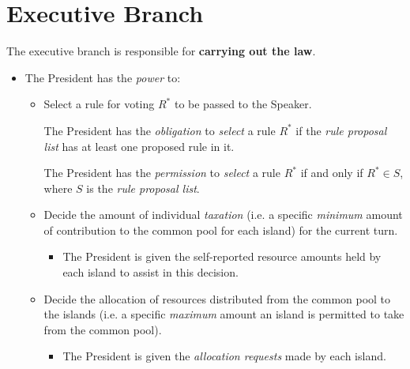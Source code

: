 \section{Executive Branch}
\label{sec:executive}
The executive branch is responsible for \textbf{carrying out the law}.
\begin{itemize}

    \item The President has the \emph{power} to:
    \begin{itemize}

        \item Select a rule for voting $R^{*}$ to be passed to the Speaker.
        \begin{rule_IIGO}
            The President has the \emph{obligation} to \emph{select} a rule $R^{*}$ if the \emph{rule proposal list} has at least one proposed rule in it.
        \end{rule_IIGO}
        \begin{rule_IIGO}
            The President has the \emph{permission} to \emph{select} a rule $R^{*}$ if and only if $R^{*} \in S$, where $S$ is the \emph{rule proposal list}.
        \end{rule_IIGO}

        \item Decide the amount of individual \emph{taxation} (i.e. a specific \emph{minimum} amount of contribution to the common pool for each island) for the current turn.

        \begin{itemize}
            \item The President is given the self-reported resource amounts held by each island to assist in this decision.
        \end{itemize}

        \item Decide the allocation of resources distributed from the common pool to the islands (i.e. a specific \emph{maximum} amount an island is permitted to take from the common pool).

        \begin{itemize}
            \item The President is given the \emph{allocation requests} made by each island.
        \end{itemize}
    \end{itemize}
\end{itemize}



